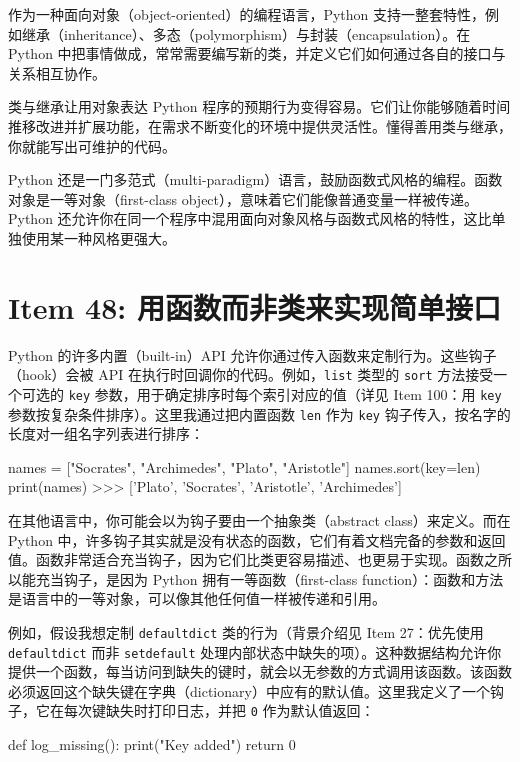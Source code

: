 作为一种面向对象（object-oriented）的编程语言，Python 支持一整套特性，例如继承（inheritance）、多态（polymorphism）与封装（encapsulation）。在 Python 中把事情做成，常常需要编写新的类，并定义它们如何通过各自的接口与关系相互协作。

类与继承让用对象表达 Python 程序的预期行为变得容易。它们让你能够随着时间推移改进并扩展功能，在需求不断变化的环境中提供灵活性。懂得善用类与继承，你就能写出可维护的代码。

Python 还是一门多范式（multi-paradigm）语言，鼓励函数式风格的编程。函数对象是一等对象（first-class object），意味着它们能像普通变量一样被传递。Python 还允许你在同一个程序中混用面向对象风格与函数式风格的特性，这比单独使用某一种风格更强大。

\section{Item 48: 用函数而非类来实现简单接口}

Python 的许多内置（built-in）API 允许你通过传入函数来定制行为。这些钩子（hook）会被 API 在执行时回调你的代码。例如，\texttt{list} 类型的 \texttt{sort} 方法接受一个可选的 \texttt{key} 参数，用于确定排序时每个索引对应的值（详见 Item 100：用 \texttt{key} 参数按复杂条件排序）。这里我通过把内置函数 \texttt{len} 作为 \texttt{key} 钩子传入，按名字的长度对一组名字列表进行排序：

\begin{codebox}[python]
names = ["Socrates", "Archimedes", "Plato", "Aristotle"]
names.sort(key=len)
print(names)
>>>
['Plato', 'Socrates', 'Aristotle', 'Archimedes']
\end{codebox}

在其他语言中，你可能会以为钩子要由一个抽象类（abstract class）来定义。而在 Python 中，许多钩子其实就是没有状态的函数，它们有着文档完备的参数和返回值。函数非常适合充当钩子，因为它们比类更容易描述、也更易于实现。函数之所以能充当钩子，是因为 Python 拥有一等函数（first-class function）：函数和方法是语言中的一等对象，可以像其他任何值一样被传递和引用。

例如，假设我想定制 \texttt{defaultdict} 类的行为（背景介绍见 Item 27：优先使用 \texttt{defaultdict} 而非 \texttt{setdefault} 处理内部状态中缺失的项）。这种数据结构允许你提供一个函数，每当访问到缺失的键时，就会以无参数的方式调用该函数。该函数必须返回这个缺失键在字典（dictionary）中应有的默认值。这里我定义了一个钩子，它在每次键缺失时打印日志，并把 \texttt{0} 作为默认值返回：

\begin{codebox}[python]
def log_missing():
    print("Key added")
    return 0
\end{codebox}

